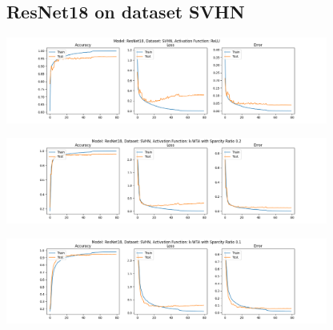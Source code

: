 \documentclass[a4paper]{article}
\begin{document}
		\subsection{ResNet18 on dataset SVHN}
			\begin{center}
				\centering
				\includegraphics[width=400px,keepaspectratio]{ResNet18_SVHN_ReLU.png}
			\end{center}
			\begin{center}
				\centering
				\includegraphics[width=400px,keepaspectratio]{ResNet18_SVHN_k-WTA_0.2.png}
			\end{center}
			\begin{center}
				\centering
				\includegraphics[width=400px,keepaspectratio]{ResNet18_SVHN_k-WTA_0.1.png}
			\end{center}
		
\end{document}

